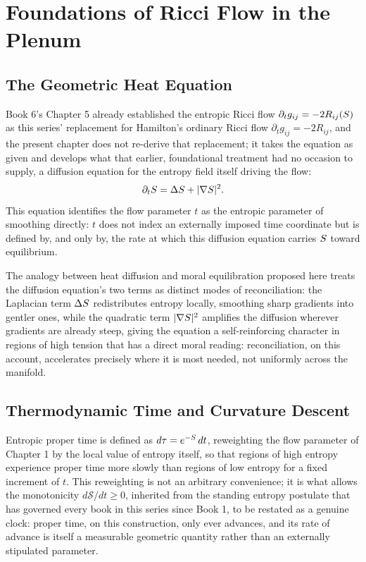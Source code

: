 \part{Foundations of Ricci Flow in the Plenum}

\chapter{The Geometric Heat Equation}

Book 6's Chapter 5 already established the entropic Ricci flow $\partial_t g_{ij} = -2 R_{ij}(S)$ as this series' replacement for Hamilton's ordinary Ricci flow $\partial_t g_{ij} = -2 R_{ij}$, and the present chapter does not re-derive that replacement; it takes the equation as given and develops what that earlier, foundational treatment had no occasion to supply, a diffusion equation for the entropy field itself driving the flow:
\[
\partial_t S = \Delta S + |\nabla S|^2.
\]
This equation identifies the flow parameter $t$ as the entropic parameter of smoothing directly: $t$ does not index an externally imposed time coordinate but is defined by, and only by, the rate at which this diffusion equation carries $S$ toward equilibrium.

The analogy between heat diffusion and moral equilibration proposed here treats the diffusion equation's two terms as distinct modes of reconciliation: the Laplacian term $\Delta S$ redistributes entropy locally, smoothing sharp gradients into gentler ones, while the quadratic term $|\nabla S|^2$ amplifies the diffusion wherever gradients are already steep, giving the equation a self-reinforcing character in regions of high tension that has a direct moral reading: reconciliation, on this account, accelerates precisely where it is most needed, not uniformly across the manifold.

\chapter{Thermodynamic Time and Curvature Descent}

Entropic proper time is defined as $d\tau = e^{-S}\, dt$, reweighting the flow parameter of Chapter 1 by the local value of entropy itself, so that regions of high entropy experience proper time more slowly than regions of low entropy for a fixed increment of $t$. This reweighting is not an arbitrary convenience; it is what allows the monotonicity $d\mathcal{S}/dt \geq 0$, inherited from the standing entropy postulate that has governed every book in this series since Book 1, to be restated as a genuine clock: proper time, on this construction, only ever advances, and its rate of advance is itself a measurable geometric quantity rather than an externally stipulated parameter.

